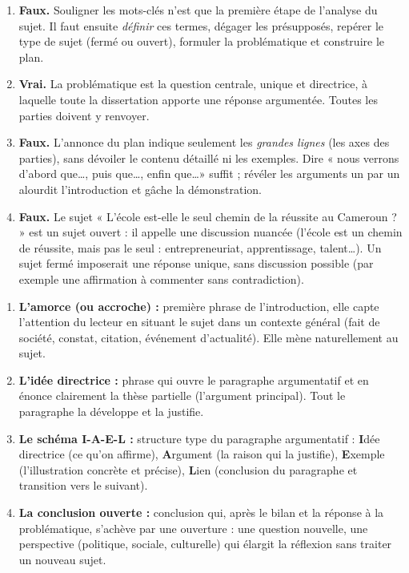 \documentclass[11pt]{article}
\newcommand{\cle}[1]{{\popxbold\color{popdark}#1}}
\begin{document}
\begin{corrige}
\begin{enumerate}
\item \textbf{Faux.} Souligner les mots-clés n'est que la première étape de l'analyse du sujet. Il faut ensuite \emph{définir} ces termes, dégager les présupposés, repérer le type de sujet (fermé ou ouvert), formuler la \cle{problématique} et construire le plan.
\item \textbf{Vrai.} La problématique est la question centrale, unique et directrice, à laquelle toute la dissertation apporte une réponse argumentée. Toutes les parties doivent y renvoyer.
\item \textbf{Faux.} L'annonce du plan indique seulement les \emph{grandes lignes} (les axes des parties), sans dévoiler le contenu détaillé ni les exemples. Dire « nous verrons d'abord que\ldots, puis que\ldots, enfin que\ldots » suffit ; révéler les arguments un par un alourdit l'introduction et gâche la démonstration.
\item \textbf{Faux.} Le sujet « L'école est-elle le seul chemin de la réussite au Cameroun ? » est un sujet \cle{ouvert} : il appelle une discussion nuancée (l'école est un chemin de réussite, mais pas le seul : entrepreneuriat, apprentissage, talent\ldots). Un sujet fermé imposerait une réponse unique, sans discussion possible (par exemple une affirmation à commenter sans contradiction).
\end{enumerate}
\end{corrige}

\begin{corrige}
\begin{enumerate}
\item \textbf{L'amorce (ou accroche) :} première phrase de l'introduction, elle capte l'attention du lecteur en situant le sujet dans un contexte général (fait de société, constat, citation, événement d'actualité). Elle mène naturellement au sujet.
\item \textbf{L'idée directrice :} phrase qui ouvre le paragraphe argumentatif et en énonce clairement la thèse partielle (l'argument principal). Tout le paragraphe la développe et la justifie.
\item \textbf{Le schéma I-A-E-L :} structure type du paragraphe argumentatif : \textbf{I}dée directrice (ce qu'on affirme), \textbf{A}rgument (la raison qui la justifie), \textbf{E}xemple (l'illustration concrète et précise), \textbf{L}ien (conclusion du paragraphe et transition vers le suivant).
\item \textbf{La conclusion ouverte :} conclusion qui, après le bilan et la réponse à la problématique, s'achève par une \cle{ouverture} : une question nouvelle, une perspective (politique, sociale, culturelle) qui élargit la réflexion sans traiter un nouveau sujet.
\end{enumerate}
\end{corrige}
\end{document}
